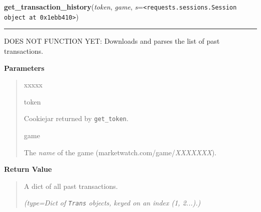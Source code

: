     \label{moira:get_transaction_history}

    \vspace{0.5ex}

\hspace{.8\funcindent}\begin{boxedminipage}{\funcwidth}

    \raggedright \textbf{get\_transaction\_history}(\textit{token}, \textit{game}, \textit{s}={\tt {\textless}requests.sessions.Session object at 0x1ebb410{\textgreater}})

    \vspace{-1.5ex}

    \rule{\textwidth}{0.5\fboxrule}
\setlength{\parskip}{2ex}
    DOES NOT FUNCTION YET: Downloads and parses the list of past 
    transactions.

\setlength{\parskip}{1ex}
      \textbf{Parameters}
      \vspace{-1ex}

      \begin{quote}
        \begin{Ventry}{xxxxx}

          \item[token]

          Cookiejar returned by \texttt{get\_token}.

          \item[game]

          The \textit{name} of the game 
          (marketwatch.com/game/\textit{XXXXXXX}).

        \end{Ventry}

      \end{quote}

      \textbf{Return Value}
    \vspace{-1ex}

      \begin{quote}
      A dict of all past transactions.

      {\it (type=Dict of \texttt{Trans} objects, keyed on an index (1, 2...).)}

      \end{quote}

    \end{boxedminipage}

    \label{moira:order}


